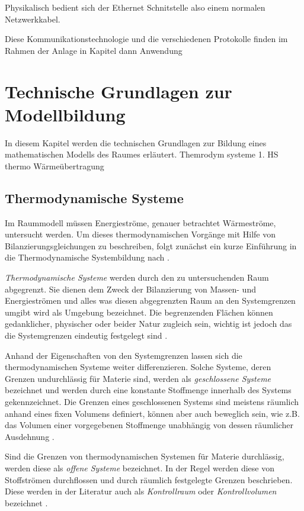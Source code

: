 Physikalisch bedient sich der Ethernet Schnitstelle also einem normalen Netzwerkkabel.

Diese Kommunikationstechnologie und die verschiedenen Protokolle finden im Rahmen der Anlage in Kapitel dann Anwendung


\section{Technische Grundlagen zur Modellbildung}
\label{sec:grundlagenmodell}
In diesem Kapitel werden die technischen Grundlagen zur Bildung eines mathematischen Modells des Raumes erläutert.
Themrodym systeme
1. HS thermo
Wärmeübertragung

\subsection{Thermodynamische Systeme}
Im Raummodell müssen Energieströme, genauer betrachtet Wärmeströme, untersucht werden. Um dieses thermodynamischen Vorgänge mit Hilfe von Bilanzierungsgleichungen zu beschreiben, folgt zunächst ein kurze Einführung in die Thermodynamische Systembildung nach \cite[S.~11ff.]{ba12}.

\textit{Thermodynamische Systeme} werden durch den zu untersuchenden Raum abgegrenzt. Sie dienen dem Zweck der Bilanzierung von Massen- und Energieströmen und alles was diesen abgegrenzten Raum an den Systemgrenzen umgibt wird als Umgebung bezeichnet. Die begrenzenden Flächen können gedanklicher, physischer oder beider Natur zugleich sein, wichtig ist jedoch das die Systemgrenzen eindeutig festgelegt sind \cite[S.~11]{ba12}.

Anhand der Eigenschaften von den Systemgrenzen lassen sich die thermodynamischen Systeme weiter differenzieren.
Solche Systeme, deren Grenzen undurchlässig für Materie sind, werden als \textit{geschlossene Systeme} bezeichnet und werden durch eine konstante Stoffmenge innerhalb des Systems gekennzeichnet. Die Grenzen eines geschlossenen Systems sind meistens räumlich anhand eines fixen Volumens definiert, können aber auch beweglich sein, wie z.B. das Volumen einer vorgegebenen Stoffmenge unabhängig von dessen räumlicher Ausdehnung \cite[S.~12]{ba12}.

Sind die Grenzen von thermodynamischen Systemen für Materie durchlässig, werden diese als \textit{offene Systeme} bezeichnet. In der Regel werden diese von Stoffströmen durchflossen und durch räumlich festgelegte Grenzen beschrieben. Diese werden in der Literatur auch als \textit{Kontrollraum} oder \textit{Kontrollvolumen} bezeichnet \cite[S.~12]{ba12}.

